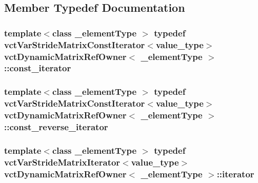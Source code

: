 \subsection{Member Typedef Documentation}
\hypertarget{classvct_dynamic_matrix_ref_owner_a7a8df19473cc2e95e25c4d1bf4bacbe4}{
\subsubsection[{const\-\_\-iterator}]{\setlength{\rightskip}{0pt plus 5cm}template$<$class \-\_\-element\-Type $>$ typedef {\bf vct\-Var\-Stride\-Matrix\-Const\-Iterator}$<$value\-\_\-type$>$ {\bf vct\-Dynamic\-Matrix\-Ref\-Owner}$<$ \-\_\-element\-Type $>$\-::{\bf const\-\_\-iterator}}}\label{classvct_dynamic_matrix_ref_owner_a7a8df19473cc2e95e25c4d1bf4bacbe4}
\hypertarget{classvct_dynamic_matrix_ref_owner_a50c3b985899b0d6cb2f9fab9f8305207}{
\subsubsection[{const\-\_\-reverse\-\_\-iterator}]{\setlength{\rightskip}{0pt plus 5cm}template$<$class \-\_\-element\-Type $>$ typedef {\bf vct\-Var\-Stride\-Matrix\-Const\-Iterator}$<$value\-\_\-type$>$ {\bf vct\-Dynamic\-Matrix\-Ref\-Owner}$<$ \-\_\-element\-Type $>$\-::{\bf const\-\_\-reverse\-\_\-iterator}}}\label{classvct_dynamic_matrix_ref_owner_a50c3b985899b0d6cb2f9fab9f8305207}
\hypertarget{classvct_dynamic_matrix_ref_owner_aaf9f6aaf86c05aec0bcd354d40c11863}{
\subsubsection[{iterator}]{\setlength{\rightskip}{0pt plus 5cm}template$<$class \-\_\-element\-Type $>$ typedef {\bf vct\-Var\-Stride\-Matrix\-Iterator}$<$value\-\_\-type$>$ {\bf vct\-Dynamic\-Matrix\-Ref\-Owner}$<$ \-\_\-element\-Type $>$\-::{\bf iterator}}}\label{classvct_dynamic_matrix_ref_owner_aaf9f6aaf86c05aec0bcd354d40c11863}
